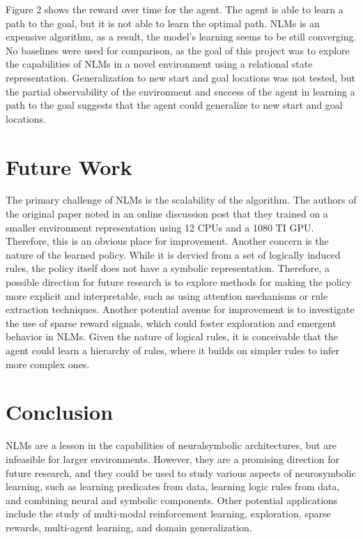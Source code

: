 \documentclass{article}
\begin{document}
Figure 2 shows the reward over time for the agent. The agent is able to learn a path to the goal, but it is not able to learn the optimal path. NLMs is an expensive algorithm, as a result, the model's learning seems to be still converging. No baselines were used for comparison, as the goal of this project was to explore the capabilities of NLMs in a novel environment using a relational state representation. Generalization to new start and goal locations was not tested, but the partial observability of the environment and success of the agent in learning a path to the goal suggests that the agent could generalize to new start and goal locations.

\section{Future Work}
The primary challenge of NLMs is the scalability of the algorithm. The authors of the original paper noted in an online discussion post that they trained on a smaller environment representation using 12 CPUs and a 1080 TI GPU. Therefore, this is an obvious place for improvement. Another concern is the nature of the learned policy. While it is dervied from a set of logically induced rules, the policy itself does not have a symbolic representation. Therefore, a possible direction for future research is to explore methods for making the policy more explicit and interpretable, such as using attention mechanisms or rule extraction techniques. Another potential avenue for improvement is to investigate the use of sparse reward signals, which could foster exploration and emergent behavior in NLMs. Given the nature of logical rules, it is conceivable that the agent could learn a hierarchy of rules, where it builds on simpler rules to infer more complex ones.

\section{Conclusion}

NLMs are a lesson in the capabilities of neuralsymbolic architectures, but are infeasible for larger environments. However, they are a promising direction for future research, and they could be used to study various aspects of neurosymbolic learning, such as learning predicates from data, learning logic rules from data, and combining neural and symbolic components. Other potential applications include the study of multi-modal reinforcement learning, exploration, sparse rewards, multi-agent learning, and domain generalization.
\end{document}

